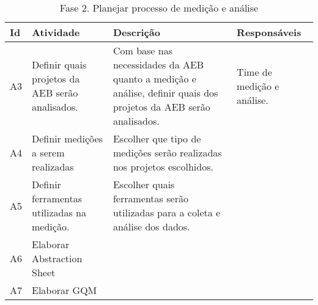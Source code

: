 \begin{table}[H]
\centering
\begin{tabular}{|p{1cm}|p{2cm}|p{5cm}|p{3cm}|}
\hline
	\textbf{Id} &
	\textbf{Atividade} &
	\textbf{Descrição} &
  \textbf{Responsáveis}
	\\ \hline
	A3 &
	Definir quais projetos da AEB serão analisados. &
	Com base nas necessidades da AEB quanto a medição e análise, definir quais dos projetos da AEB serão analisados. &
	Time de medição e análise.
	\\ \hline
	A4 &
	Definir medições a serem realizadas &
	Escolher que tipo de medições serão realizadas nos projetos escolhidos. &

	\\ \hline
	A5 &
	Definir ferramentas utilizadas na medição. &
	Escolher quais ferramentas serão utilizadas para a coleta e análise dos dados. &

	\\ \hline
	A6 &
	Elaborar Abstraction Sheet &
	 &

	\\ \hline
	A7 &
	Elaborar GQM &
	 &

	\\ \hline
\end{tabular}
\caption{Fase 2. Planejar processo de medição e análise}
\label{tab:atividades_fase_2}
\end{table}

